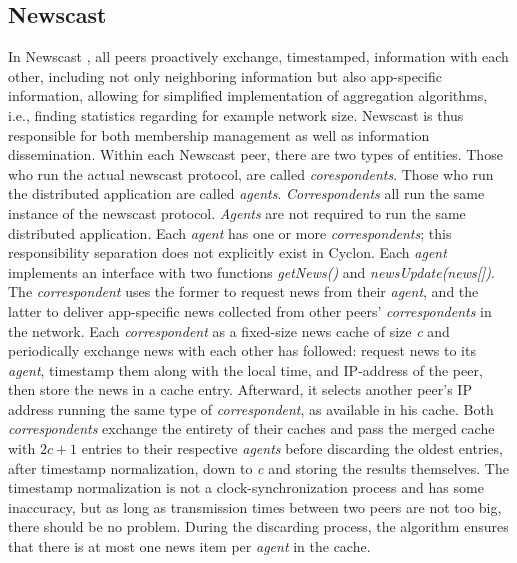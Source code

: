 \documentclass[runningheads]{llncs}
\begin{document}
\subsection{Newscast}
In Newscast \cite{newscast-computing}, all peers proactively exchange, timestamped, information with each other, including not only neighboring information but also app-specific information, allowing for simplified implementation of aggregation algorithms, i.e., finding statistics regarding for example network size. Newscast is thus responsible for both membership management as well as information dissemination. Within each Newscast peer, there are two types of entities. Those who run the actual newscast protocol, are called \textit{corespondents}. Those who run the distributed application are called \textit{agents}. \textit{Correspondents} all run the same instance of the newscast protocol. \textit{Agents} are not required to run the same distributed application. Each \textit{agent} has one or more \textit{correspondents}; this responsibility separation does not explicitly exist in Cyclon. Each \textit{agent} implements an interface with two functions \textit{getNews()} and \textit{newsUpdate(news[])}. The \textit{correspondent} uses the former to request news from their \textit{agent}, and the latter to deliver app-specific news collected from other peers' \textit{correspondents} in the network. Each \textit{correspondent} as a fixed-size news cache of size \textit{c} and periodically exchange news with each other has followed: request news to its \textit{agent}, timestamp them along with the local time, and IP-address of the peer, then store the news in a cache entry. Afterward, it selects another peer's IP address running the same type of \textit{correspondent}, as available in his cache. Both \textit{correspondents} exchange the entirety of their caches and pass the merged cache with $2c+1$ entries to their respective \textit{agents} before discarding the oldest entries, after timestamp normalization, down to \textit{c} and storing the results themselves. The timestamp normalization is not a clock-synchronization process and has some inaccuracy, but as long as transmission times between two peers are not too big, there should be no problem. During the discarding process, the algorithm ensures that there is at most one news item per \textit{agent} in the cache.
\end{document}
